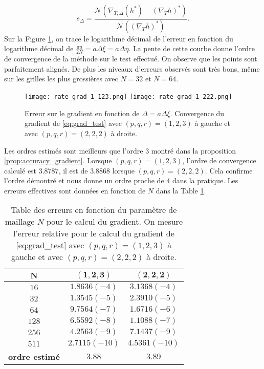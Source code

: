 \begin{equation}
e_{\Delta} = \dfrac{\mathcal{N}\left(\nabla_{T,\Delta}(h^*) - \left( \nabla_{T}h \right)^* \right)}{\mathcal{N}\left(\left( \nabla_{T}h \right)^* \right)}.
\end{equation}
Sur la Figure \ref{fig:rate_grad}, on trace le logarithme décimal de l'erreur en fonction du logarithme décimal de $\frac{\pi a}{2 N} = a \Delta \xi = a \Delta \eta$. La pente de cette courbe donne l'ordre de convergence de la méthode sur le test effectué. On observe que les points sont parfaitement alignés. De plus les niveaux d'erreurs observés sont très bons, même sur les grilles les plus grossières avec $N=32$ et $N=64$.

\begin{figure}[htbp]
\begin{center}
\texttt{[image: rate\_grad\_1\_123.png]}
\texttt{[image: rate\_grad\_1\_222.png]}
\end{center}
\caption{Erreur sur le gradient en fonction de $\Delta = a\Delta \xi$. Convergence du gradient de \eqref{eq:grad_test} avec $(p,q,r)=(1,2,3)$ à gauche et avec $(p,q,r)=(2,2,2)$ à droite.}
\label{fig:rate_grad}
\end{figure}

Les ordres estimés sont meilleurs que l'ordre 3 montré dans la proposition \ref{prop:accuracy_gradient}. Lorsque $(p,q,r)=(1,2,3)$, l'ordre de convergence calculé est $3.8787$, il est de $3.8868$ lorsque $(p,q,r)=(2,2,2)$. Cela confirme l'ordre démontré et nous donne un ordre proche de $4$ dans la pratique. Les erreurs effectives sont données en fonction de $N$ dans la Table \ref{tab:rate_grad}.

\begin{table}[htbp]
\begin{center}
\begin{tabular}{|c||c|c|}
\hline
$\mathbf{N}$    & $\mathbf{(1,2,3)}$     & $\mathbf{(2,2,2)}$     \\
\hline
\hline
$16$   & $1.8636 (-4)$ & $3.1368 (-4)$ \\
$32$   & $1.3545 (-5)$ & $2.3910 (-5)$ \\
$64$   & $9.7564 (-7)$ & $1.6716 (-6)$ \\
$128$  & $6.5592 (-8)$ & $1.1088 (-7)$ \\
$256$  & $4.2563 (-9)$ & $7.1437 (-9)$ \\
$511$  & $2.7115(-10)$ & $4.5361(-10)$ \\
\hline
\hline
\textbf{ordre estimé} & $3.88$ & $3.89$ \\
\hline 
\end{tabular}
\end{center}
\caption{Table des erreurs en fonction du paramètre de maillage $N$ pour le calcul du gradient. On mesure l'erreur relative pour le calcul du gradient de \eqref{eq:grad_test} avec $(p,q,r)=(1,2,3)$ à gauche et avec $(p,q,r)=(2,2,2)$ à droite.}
\label{tab:rate_grad}
\end{table}














